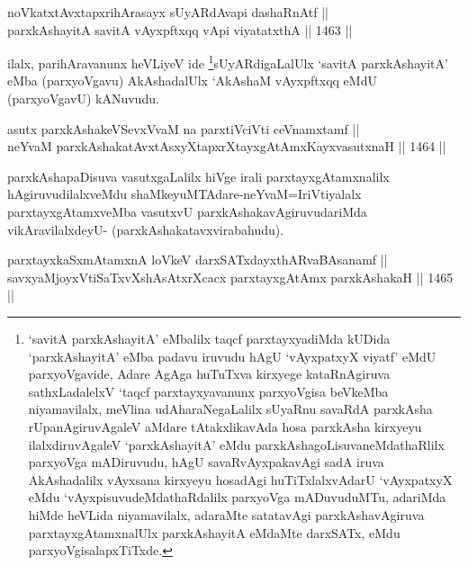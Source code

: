 
\begin{shl}
noVkatxtAvxtapxrihArasayx sUyARdAvapi dashaRnAtf || \\
parxkAshayitA savitA vAyxpftxqq vA\s pi viyatatxthA ||  1463 ||  
\end{shl}

\begin{artha}
ilalx, parihAravanunx heVLiyeV ide \footnote{`savitA parxkAshayitA' eMbalilx taqcf parxtayxyadiMda kUDida `parxkAshayitA' eMba padavu iruvudu hAgU `vAyxpatxyX viyatf' eMdU parxyoVgavide, Adare AgAga huTuTxva kirxyege kataRnAgiruva sathxLadalelxV `taqcf parxtayxyavanunx parxyoVgisa beVkeMba niyamavilalx, meVlina udAharaNegaLalilx sUyaRnu savaRdA parxkAsha rUpanAgiruvAgaleV aMdare tAtakxlikavAda hosa parxkAsha kirxyeyu ilalxdiruvAgaleV `parxkAshayitA' eMdu parxkAshagoLisuvaneMdathaRlilx parxyoVga mADiruvudu, hAgU savaRvAyxpakavAgi sadA iruva AkAshadalilx vAyxsana kirxyeyu hosadAgi huTiTxlalxvAdarU `vAyxpatxyX eMdu `vAyxpisuvudeMdathaRdalilx parxyoVga mADuvuduMTu, adariMda hiMde heVLida niyamavilalx, adaraMte satatavAgi parxkAshavAgiruva parxtayxgAtamxnalUlx parxkAshayitA eMdaMte darxSATx, eMdu parxyoVgisalapxTiTxde.}sUyARdigaLalUlx `savitA parxkAshayitA' eMba (parxyoVgavu) AkAshadalUlx `AkAshaM vAyxpftxqq eMdU (parxyoVgavU) kANuvudu.
\end{artha}


\begin{shl}
asutx parxkAshakeVSevxVvaM na parxtiVciVti ceVnamxtamf || \\
neYvaM parxkAshakatAvxtAsxyXtapxrXtayxgAtAmxKayxvasutxnaH ||  1464 ||  
\end{shl}

\begin{artha}
parxkAshapaDisuva vasutxgaLalilx hiVge irali parxtayxgAtamxnalilx hAgiruvudilalxveMdu shaMkeyuMTAdare-neYvaM=IriVtiyalalx parxtayxgAtamxveMba vasutxvU parxkAshakavAgiruvudariMda vikAravilalxdeyU- (parxkAshakatavxvirabahudu).
\end{artha}


\begin{shl}
parxtayxkaSxmAtamxnA loVkeV darxSATxdayxthARvaBAsanamf || \\
savxyaMjoyxVtiSaTxvXshAsAtxrXcacx parxtayxgAtAmx parxkAshakaH ||  1465 ||  
\end{shl}


